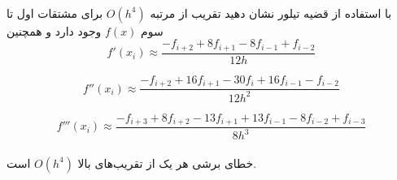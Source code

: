 \\
با استفاده از قضیه تیلور نشان دهید تقریب از مرتبه \(O(h^4)\) برای مشتقات اول تا سوم \(f(x)\) وجود دارد و همچنین
\\
\[ f'(x_i) \approx \frac{{-f_{i+2} + 8f_{i+1} - 8f_{i-1} + f_{i-2}}}{{12h}} \]

\[ f''(x_i) \approx \frac{{-f_{i+2} + 16f_{i+1} - 30f_i + 16f_{i-1} - f_{i-2}}}{{12h^2}} \]

\[ f'''(x_i) \approx \frac{{-f_{i+3} + 8f_{i+2} - 13f_{i+1} + 13f_{i-1} - 8f_{i-2} + f_{i-3}}}{{8h^3}} \]
\\
خطای برشی هر یک از تقریب‌های بالا \(O(h^4)\) است.
